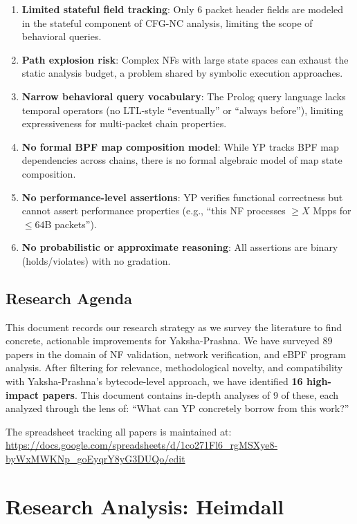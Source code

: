\documentclass[12pt, a4paper]{article}
\begin{document}
\begin{enumerate}
  \item \textbf{Limited stateful field tracking}: Only 6 packet header fields are modeled in the stateful component of CFG-NC analysis, limiting the scope of behavioral queries.
  \item \textbf{Path explosion risk}: Complex NFs with large state spaces can exhaust the static analysis budget, a problem shared by symbolic execution approaches.
  \item \textbf{Narrow behavioral query vocabulary}: The Prolog query language lacks temporal operators (no LTL-style ``eventually'' or ``always before''), limiting expressiveness for multi-packet chain properties.
  \item \textbf{No formal BPF map composition model}: While YP tracks BPF map dependencies across chains, there is no formal algebraic model of map state composition.
  \item \textbf{No performance-level assertions}: YP verifies functional correctness but cannot assert performance properties (e.g., ``this NF processes $\geq X$ Mpps for $\leq 64$B packets'').
  \item \textbf{No probabilistic or approximate reasoning}: All assertions are binary (holds/violates) with no gradation.
\end{enumerate}

\subsection{Research Agenda}

This document records our research strategy as we survey the literature to find concrete, actionable improvements for Yaksha-Prashna. We have surveyed 89 papers in the domain of NF validation, network verification, and eBPF program analysis. After filtering for relevance, methodological novelty, and compatibility with Yaksha-Prashna's bytecode-level approach, we have identified \textbf{16 high-impact papers}. This document contains in-depth analyses of 9 of these, each analyzed through the lens of: ``What can YP concretely borrow from this work?''

The spreadsheet tracking all papers is maintained at:\\
\url{https://docs.google.com/spreadsheets/d/1co271Fl6_rgMSXye8-byWxMWKNp_goEyqrY8yG3DUQo/edit}

\section{Research Analysis: Heimdall}
\label{sec:heimdall}
\end{document}

